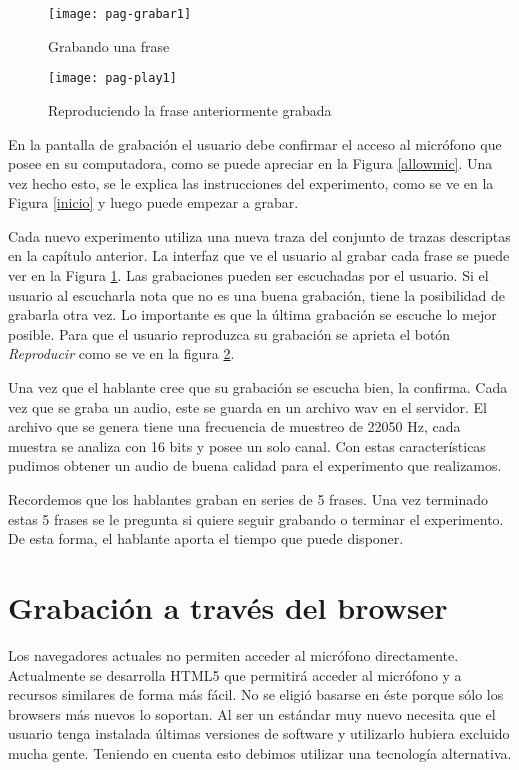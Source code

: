 \begin{figure}[h!]
    \centerline{\texttt{[image: pag-grabar1]} }
    \caption{Grabando una frase}
    \label{grabando}
\end{figure}

\begin{figure}[h!]
    \centerline{\texttt{[image: pag-play1]} }
    \caption{Reproduciendo la frase anteriormente grabada}
    \label{reproduciendo}
\end{figure}

En la pantalla de grabación el usuario debe confirmar el acceso al micrófono que posee en su computadora, como se puede apreciar en la Figura \ref{allowmic}. Una vez hecho esto, se le explica las instrucciones del experimento, como se ve en la Figura \ref{inicio} y luego puede empezar a grabar. 

Cada nuevo experimento utiliza una nueva traza del conjunto de trazas descriptas en la capítulo anterior. La interfaz que ve el usuario al grabar cada frase se puede ver en la Figura \ref{grabando}. Las grabaciones pueden ser escuchadas por el usuario. Si el usuario al escucharla nota que no es una buena grabación, tiene la posibilidad de grabarla otra vez. Lo importante es que la última grabación se escuche lo mejor posible. Para que el usuario reproduzca su grabación se aprieta el botón \textit{Reproducir} como se ve en la figura \ref{reproduciendo}. 

Una vez que el hablante cree que su grabación se escucha bien, la confirma. Cada vez que se graba un audio, este se guarda en un archivo wav en el servidor. El archivo que se genera tiene una frecuencia de muestreo de 22050 Hz, cada muestra se analiza con 16 bits y posee un solo canal. Con estas características pudimos obtener un audio de buena calidad para el experimento que realizamos.

Recordemos que los hablantes graban en series de 5 frases. Una vez terminado estas 5 frases se le pregunta si quiere seguir grabando o terminar el experimento. De esta forma, el hablante aporta el tiempo que puede disponer.

\section{Grabación a través del browser}

Los navegadores actuales no permiten acceder al micrófono directamente. Actualmente se desarrolla HTML5 que permitirá acceder al micrófono y a recursos similares de forma más fácil. No se eligió basarse en éste porque sólo los browsers más nuevos lo soportan. Al ser un estándar muy nuevo necesita que el usuario tenga instalada últimas versiones de software y utilizarlo hubiera excluido mucha gente. Teniendo en cuenta esto debimos utilizar una tecnología alternativa. 

